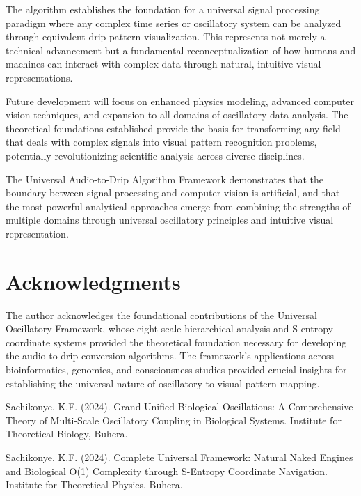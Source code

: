 \documentclass[12pt,a4paper]{article}
\begin{document}
{{{The algorithm establishes the foundation for a universal signal processing paradigm where any complex time series or oscillatory system can be analyzed through equivalent drip pattern visualization. This represents not merely a technical advancement but a fundamental reconceptualization of how humans and machines can interact with complex data through natural, intuitive visual representations.

Future development will focus on enhanced physics modeling, advanced computer vision techniques, and expansion to all domains of oscillatory data analysis. The theoretical foundations established provide the basis for transforming any field that deals with complex signals into visual pattern recognition problems, potentially revolutionizing scientific analysis across diverse disciplines.

The Universal Audio-to-Drip Algorithm Framework demonstrates that the boundary between signal processing and computer vision is artificial, and that the most powerful analytical approaches emerge from combining the strengths of multiple domains through universal oscillatory principles and intuitive visual representation.

\section{Acknowledgments}

The author acknowledges the foundational contributions of the Universal Oscillatory Framework, whose eight-scale hierarchical analysis and S-entropy coordinate systems provided the theoretical foundation necessary for developing the audio-to-drip conversion algorithms. The framework's applications across bioinformatics, genomics, and consciousness studies provided crucial insights for establishing the universal nature of oscillatory-to-visual pattern mapping.

\begin{thebibliography}{99}

Sachikonye, K.F. (2024). Grand Unified Biological Oscillations: A Comprehensive Theory of Multi-Scale Oscillatory Coupling in Biological Systems. Institute for Theoretical Biology, Buhera.

Sachikonye, K.F. (2024). Complete Universal Framework: Natural Naked Engines and Biological O(1) Complexity through S-Entropy Coordinate Navigation. Institute for Theoretical Physics, Buhera.


\end{thebibliography}}}}
\end{document}
